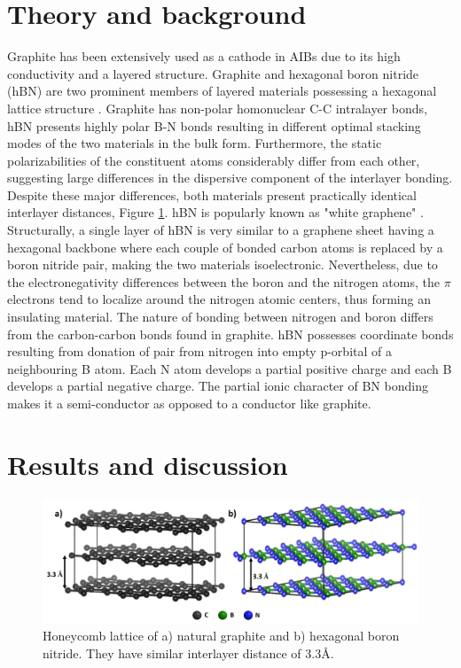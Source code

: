 \section{Theory and background}
Graphite has been extensively used as a cathode in AIBs due to its high conductivity and a layered structure. Graphite and hexagonal boron nitride (hBN) are two prominent members of layered materials possessing a hexagonal lattice structure \cite{hod_graphite_2012}. Graphite has non-polar homonuclear C-C intralayer bonds, hBN presents highly polar B-N bonds resulting in different optimal stacking modes of the two materials in the bulk form. Furthermore, the static polarizabilities of the constituent atoms considerably differ from each other, suggesting large differences in the dispersive component of the interlayer bonding. Despite these major differences, both materials present practically identical interlayer distances, Figure \ref{Figures/BOhBN:grpBNcomp}. hBN is popularly known as "white graphene" \cite{song_large_2010, zeng_white_2010}. Structurally, a single layer of hBN is very similar to a graphene sheet having a hexagonal backbone where each couple of bonded carbon atoms is replaced by a boron nitride pair, making the two materials isoelectronic. Nevertheless, due to the electronegativity differences between the boron and the nitrogen atoms, the $\pi$ electrons tend to localize around the nitrogen atomic centers, thus forming an insulating material. The nature of bonding between nitrogen and boron differs from the carbon-carbon bonds found in graphite. hBN possesses coordinate bonds resulting from donation of  pair from nitrogen into empty p-orbital of a neighbouring B atom. Each N atom develops a partial positive charge and each B develops a partial negative charge. The partial ionic character of BN bonding makes it a semi-conductor as opposed to a conductor like graphite. 

\section{Results and discussion}

\begin{figure}[tbh!]
\centering
\includegraphics[width=\textwidth]{Figures/BOhBN/grpBNcomp}
\caption{Honeycomb lattice of a) natural graphite and b) hexagonal boron nitride. They have similar interlayer distance of 3.3\AA.}
\label{Figures/BOhBN:grpBNcomp}
\end{figure}

